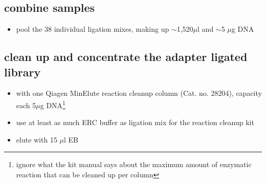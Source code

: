\subsection
{combine samples}
\begin{itemize}
\item pool the 38 individual ligation mixes, making up $\sim$1,520$\mu$l and $\sim$5 $\mu$g DNA 
\end{itemize}




\subsection
{clean up and concentrate the adapter ligated library}
\begin{itemize}
\item with one Qiagen MinElute reaction cleanup column (Cat. no. 28204), capacity each 5$\mu$g DNA\footnote{ignore what the kit manual says about the maximum amount of enzymatic reaction that can be cleaned up per column}
\item use at least as much ERC buffer as ligation mix for the reaction cleanup kit 
\item elute with 15 $\mu$l EB
\end{itemize}

